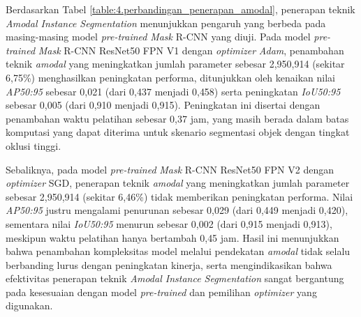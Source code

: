 Berdasarkan Tabel \ref{table:4.perbandingan_penerapan_amodal}, penerapan teknik \textit{Amodal Instance Segmentation} menunjukkan pengaruh yang berbeda pada masing-masing model \textit{pre-trained} \textit{Mask} R-CNN yang diuji. Pada model \textit{pre-trained} \textit{Mask} R-CNN ResNet50 FPN V1 dengan \textit{optimizer} \textit{Adam}, penambahan teknik \textit{amodal} yang meningkatkan jumlah parameter sebesar 2{,}950{,}914 (sekitar 6{,}75\%) menghasilkan peningkatan performa, ditunjukkan oleh kenaikan nilai \textit{AP50:95} sebesar 0{,}021 (dari 0{,}437 menjadi 0{,}458) serta peningkatan \textit{IoU50:95} sebesar 0{,}005 (dari 0{,}910 menjadi 0{,}915). Peningkatan ini disertai dengan penambahan waktu pelatihan sebesar 0{,}37 jam, yang masih berada dalam batas komputasi yang dapat diterima untuk skenario segmentasi objek dengan tingkat oklusi tinggi.

Sebaliknya, pada model \textit{pre-trained} \textit{Mask} R-CNN ResNet50 FPN V2 dengan \textit{optimizer} SGD, penerapan teknik \textit{amodal}  yang meningkatkan jumlah parameter sebesar 2{,}950{,}914 (sekitar 6{,}46\%) tidak memberikan peningkatan performa. Nilai \textit{AP50:95} justru mengalami penurunan sebesar 0{,}029 (dari 0{,}449 menjadi 0{,}420), sementara nilai \textit{IoU50:95} menurun sebesar 0{,}002 (dari 0{,}915 menjadi 0{,}913), meskipun waktu pelatihan hanya bertambah 0{,}45 jam. Hasil ini menunjukkan bahwa penambahan kompleksitas model melalui pendekatan \textit{amodal} tidak selalu berbanding lurus dengan peningkatan kinerja, serta mengindikasikan bahwa efektivitas penerapan teknik \textit{Amodal Instance Segmentation} sangat bergantung pada kesesuaian dengan model \textit{pre-trained} dan pemilihan \textit{optimizer} yang digunakan.

